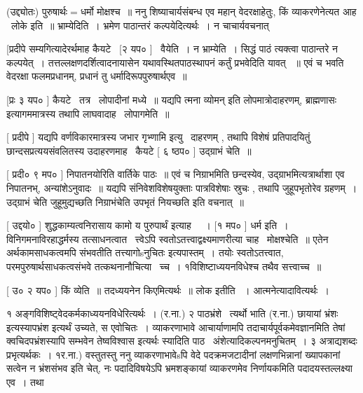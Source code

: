 \documentclass[11pt, openany]{book}
\begin{document}
 (उद्द्योतः) पुरुषार्थः$=$धर्मो मोक्षश्च~॥ ननु शिष्याचार्यसंबन्ध एव
महान् वेदरक्षाहेतुः, किं व्याकरणेनेत्यत आह \textendash\ लोके इति~॥ भ्राम्येदिति~। 
भ्रमेण पाठान्तरं कल्पयेदित्यर्थः~। न चाचार्यवचनात् 



 [प्रदीपे सम्यगित्यादेरर्थमाह कैयटे \textendash\ [२ यप० ] \textendash\ वैयेति~। न
भ्राम्येति~। सिद्धं पाठं त्यक्त्वा पाठान्तरे न कल्पयेत्~। 
तत्तल्लक्षणदर्शित्वादनायासेन यथावस्थितपाठस्थापनं कर्तुं प्रभवेदिति यावत्
~॥ एवं च भवति वेदरक्षा फलमप्रधानम्, प्रधानं तु धर्मादिरूपपुरुषार्थएव~॥


 [प्रः ३ यप० ] कैयटे \textendash\ तत्र \textendash\ लोपादीनां मध्ये~॥ यद्यपि {\qt त्मना
व्योमन्} इति लोपमात्रोदाहरणम्, ब्राह्मणासः इत्यागममात्रस्य तथापि
लाघवादाह \textendash\ लोपागमेति~॥ 

 [ प्रदीपे ] यद्यपि वर्णविकारमात्रस्य जभार गृभ्णामि इत्यु \textendash\ दाहरणम्
, तथापि विशेषं प्रतिपादयितुं छान्दसप्रत्ययसंवलितस्य उदाहरणमाह \textendash\ कैयटे [
६ ष्ठप० ] उद्ग्राभं चेति~॥ 

 [ प्रदी० ९ मप० ] निपातनयोरिति वार्तिके पाठः~॥ एवं च निग्राभमिति
छन्दस्येव, उद्ग्राभमित्यत्रार्थाशा एव निपातनभ्, अन्यांशेऽनुवादः~॥
यद्यपि संनिवेशविशेषयुक्ताः पात्रविशेषाः स्रुचः , तथापि जुहूपभृतोरेव
ग्रहणम्~। {\qt  उद्ग्राभं चेति जुहूमुद्यच्छति निग्राभंचेति उपभृतं नियच्छति}
इति वचनात्~॥ 

 [ उद्दयो० ] शुद्धकाम्यत्वनिरासाय कामो य पुरुपार्थं इत्याह \textendash\ ~। [१
मप० ] धर्म इति~। विनिगमनाविरहाद्धर्मस्य तत्साधनत्वात \textendash\ त्त्वेऽपि
स्वतोऽतत्त्वाद्वक्ष्यमाणरीत्या चाह \textendash\ मोक्षश्चेति~॥ एतेन
{\qt अर्थकामसाधकत्वमपि संभवतीति तत्त्यागोsनुचितः} इत्यपास्तम्~। तयोः
स्वतोऽतत्त्वात, परमपुरुषार्थसाधकत्वसंभवे तत्कथनानौचित्या \textendash\ च्च~। 
१विशिष्टाध्ययनविधेश्च तथैव सत्त्वाच्च~॥ 

 [ उ० २ यप० ] किं व्येति~॥ तदध्ययनेन किएमित्यर्थः~॥ लोक इतीति
~। आत्मनेत्यादावित्यर्थः~। 



१ अङ्गविशिष्ट्वेदकर्मकाध्ययनविधेरित्यर्थः~। (र.ना.) २ पाठभ्रंशे \textendash\ 
त्यर्थो भाति (र.ना.) छायायां {\qt भ्रंशः इत्यस्यापभ्रंश} इत्यर्थं उच्यते, स
एवोचितः~। व्याकरणाभावे आचार्याणामपि तदाचार्यपूर्वकमेवज्ञानमिति तेषां
क्वचिदपभ्रंशस्यापि सम्भवेन तेष्वविश्वास इत्यर्थः स्यादिति
पाठ \textendash\ अंशेत्यादिकल्पनमनुचितम्~। ३ अत्राद्यशब्दः प्रभृत्यर्थकः~। १र.ना.)
वस्तुतस्तु ननु व्याकरणाभावेsपि वेदे पदक्रमजटादीनां लक्षणभिन्नानां
ख्यापकानां सत्वेन न भ्रंशसंभव इति चेत्, नः पदादिविषयेऽपि भ्रमशङ्कायां
व्याकरणमेव निर्णायकमिति पदादयस्तल्लक्ष्या एव~। तथा
\end{document}
